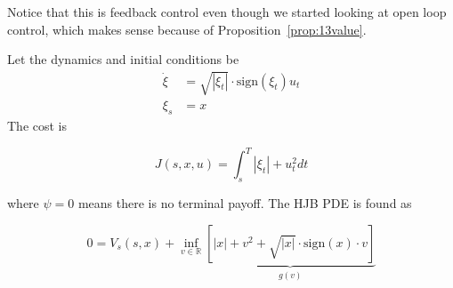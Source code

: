 Notice that this is feedback control even though we started looking at open loop control, which makes sense because of Proposition~\ref{prop:13value}.

\begin{example}%
\label{ex:13hjb}
Let the dynamics and initial conditions be
\begin{align*}
\dot{\xi} &= \sqrt{|\xi_t|}\cdot \text{sign}(\xi_t)u_t \\
\xi_s &= x
\end{align*}
The cost is

\begin{equation*}
J(s,x,u) = \int_s^T |\xi_t|+u_t^2dt
\end{equation*}

where $\psi=0$ means there is no terminal payoff.
The HJB PDE is found as

\begin{equation*}
0 = V_s(s,x) + \inf_{v\in\mathbb{R}} \underbrace{\left[|x|+v^2+\sqrt{|x|}\cdot\text{sign}(x)\cdot v\right]}_{g(v)}
\end{equation*}


\end{example}
